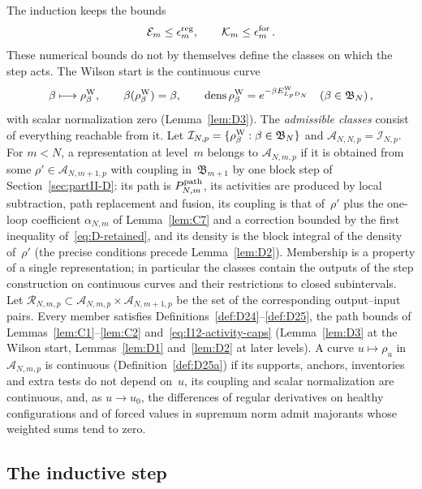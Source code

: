 The induction keeps the bounds
\begin{equation}\label{eq:I12-activity-caps}
\mathcal E_m\le\epsilon_m^{\rm reg},\qquad \mathcal K_m\le\epsilon_m^{\rm for}\,.
\end{equation}
These numerical bounds do not by themselves define the classes on which the step acts. The Wilson start is the continuous curve
\begin{equation}\label{eq:I12-Wilson-initialization}
\beta\longmapsto\rho^{\rm W}_\beta,\qquad
\beta(\rho^{\rm W}_\beta)=\beta,\qquad
\operatorname{dens}\rho^{\rm W}_\beta=e^{-\beta E^{\rm W}_{L_pD_N}}
\quad(\beta\in\mathfrak B_N)\,,
\end{equation}
with scalar normalization zero (Lemma~\ref{lem:D3}). The \emph{admissible classes} consist of everything reachable from it. Let $\mathcal I_{N,p}=\{\rho^{\rm W}_\beta:\beta\in\mathfrak B_N\}$ and $\mathcal A_{N,N,p}=\mathcal I_{N,p}$. For $m<N$, a representation at level~$m$ belongs to $\mathcal A_{N,m,p}$ if it is obtained from some $\rho'\in\mathcal A_{N,m+1,p}$ with coupling in~$\mathfrak B_{m+1}$ by one block step of Section~\ref{sec:partII-D}: its path is $P^{\mathrm{path}}_{N,m}$, its activities are produced by local subtraction, path replacement and fusion, its coupling is that of~$\rho'$ plus the one-loop coefficient $\alpha_{N,m}$ of Lemma~\ref{lem:C7} and a correction bounded by the first inequality of~\eqref{eq:D-retained}, and its density is the block integral of the density of~$\rho'$ (the precise conditions precede Lemma~\ref{lem:D2}). Membership is a property of a single representation; in particular the classes contain the outputs of the step construction on continuous curves and their restrictions to closed subintervals. Let $\mathcal R_{N,m,p}\subset\mathcal A_{N,m,p}\times\mathcal A_{N,m+1,p}$ be the set of the corresponding output--input pairs. Every member satisfies Definitions~\ref{def:D24}--\ref{def:D25}, the path bounds of Lemmas~\ref{lem:C1}--\ref{lem:C2} and~\eqref{eq:I12-activity-caps} (Lemma~\ref{lem:D3} at the Wilson start, Lemmas~\ref{lem:D1} and~\ref{lem:D2} at later levels). A curve $u\mapsto\rho_u$ in $\mathcal A_{N,m,p}$ is continuous (Definition~\ref{def:D25a}) if its supports, anchors, inventories and extra tests do not depend on~$u$, its coupling and scalar normalization are continuous, and, as $u\to u_0$, the differences of regular derivatives on healthy configurations and of forced values in supremum norm admit majorants whose weighted sums tend to zero.

\subsection{The inductive step}\label{sec:inductive-step}

